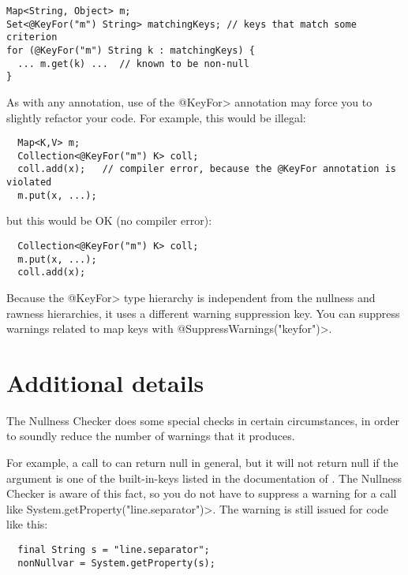 \begin{Verbatim}
Map<String, Object> m;
Set<@KeyFor("m") String> matchingKeys; // keys that match some criterion
for (@KeyFor("m") String k : matchingKeys) {
  ... m.get(k) ...  // known to be non-null
}
\end{Verbatim}

As with any annotation, use of the \<@KeyFor> annotation may force you to
slightly refactor your code.  For example, this would be illegal:

\begin{Verbatim}
  Map<K,V> m;
  Collection<@KeyFor("m") K> coll;
  coll.add(x);   // compiler error, because the @KeyFor annotation is violated
  m.put(x, ...);
\end{Verbatim}

\noindent
but this would be OK (no compiler error):

\begin{Verbatim}
  Collection<@KeyFor("m") K> coll;
  m.put(x, ...);
  coll.add(x);
\end{Verbatim}


Because the \<@KeyFor> type hierarchy is independent from the nullness and
rawness hierarchies, it uses a different warning suppression key.
You can suppress warnings related to map keys with
\<@SuppressWarnings("keyfor")>.


\section{Additional details\label{nullness-additional-details}}

The Nullness Checker does some special checks in certain circumstances, in
order to soundly reduce the number of warnings that it produces.

For example, a call to 
can return null in general, but it will not return null if the argument is
one of the built-in-keys listed in the documentation of 
.
The Nullness Checker is aware of this fact, so you do not have to suppress
a warning for a call like \<System.getProperty("line.separator")>.  The
warning is still issued for code like this:

\begin{Verbatim}
  final String s = "line.separator";
  nonNullvar = System.getProperty(s);
\end{Verbatim}

